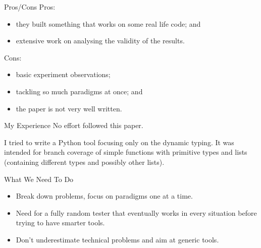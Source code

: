 \documentclass{beamer}
\begin{document}
\begin{frame}{Pros/Cons}
  Pros:
  \begin{itemize}
    \item they built something that works on some real life code; and
    \item extensive work on analysing the validity of the results.
  \end{itemize}

  Cons:
  \begin{itemize}
    \item basic experiment observations;
    \item tackling so much paradigms at once; and
    \item the paper is not very well written.
  \end{itemize}
\end{frame}

\begin{frame}{My Experience}
  No effort followed this paper.

  I tried to write a Python tool focusing only on the dynamic typing.
  It was intended for branch coverage of simple functions with primitive types and lists (containing different types and possibly other lists).
\end{frame}

\begin{frame}{What We Need To Do}
  \begin{itemize}
    \item Break down problems, focus on paradigms one at a time.
    \item Need for a fully random tester that eventually works in every situation before trying to have smarter tools.
    \item Don't underestimate technical problems and aim at generic tools.
  \end{itemize}
\end{frame}

\end{document}
